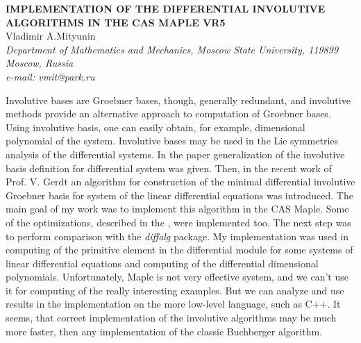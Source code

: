 \documentclass[11pt, draft]{article}
\begin{document}

\begin{center}
{\bf
IMPLEMENTATION OF THE DIFFERENTIAL INVOLUTIVE ALGORITHMS IN THE CAS MAPLE VR5}\\
\vspace {0.3cm}
{Vladimir A.Mityunin}\\
{\it \small Department of Mathematics and Mechanics, Moscow State University, 119899 Moscow,
Russia
\\ e-mail: vmit@park.ru}
\end{center}
\vspace {1.0cm}
Involutive bases are Groebner bases, though, generally redundant,
and involutive methods provide an alternative approach to
computation of Groebner bases. Using involutive basis, one can
easily obtain, for example, dimensional polynomial of the system.
Involutive bases may be used in the Lie symmetries analysis of the
differential systems. In the paper \cite{Ge} generalization of the
involutive basis definition for differential system was given.
Then, in the recent work of Prof. V. Gerdt \cite{DiffCompletion}
an algorithm for construction of the minimal differential
involutive Groebner basis for system of the linear differential
equations was introduced. The main goal of my work was to
implement this algorithm in the CAS Maple. Some of the
optimizations, described in the \cite{DiffCompletion,
Optimization, Mathematica}, were implemented too. The next step
was to perform comparison with the {\it diffalg} package. My
implementation was used in computing of the primitive element in
the differential module for some systems of linear differential
equations and computing of the differential dimensional
polynomials. Unfortunately, Maple is not very effective system,
and we can't use it for computing of the really interesting
examples. But we can analyze and use results in the
implementation on the more low-level language, such as C++. It
seems, that correct implementation of the involutive algorithms
may be much more faster, then any implementation of the classic
Buchberger algorithm.
\end{document}
